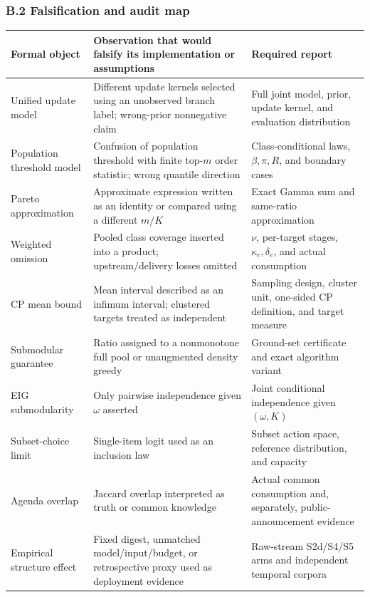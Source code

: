 \documentclass[
  11pt]{article}
\begin{document}
\subsubsection{B.2 Falsification and audit
map}\label{b.2-falsification-and-audit-map}

\begin{longtable}[]{@{}
  >{\raggedright\arraybackslash}p{}
  >{\raggedright\arraybackslash}p{}
  >{\raggedright\arraybackslash}p{}@{}}
\toprule\noalign{}
\begin{minipage}[b]{\linewidth}\raggedright
Formal object
\end{minipage} & \begin{minipage}[b]{\linewidth}\raggedright
Observation that would falsify its implementation or assumptions
\end{minipage} & \begin{minipage}[b]{\linewidth}\raggedright
Required report
\end{minipage} \\
\midrule\noalign{}
\endhead
\bottomrule\noalign{}
\endlastfoot
Unified update model & Different update kernels selected using an
unobserved branch label; wrong-prior nonnegative claim & Full joint
model, prior, update kernel, and evaluation distribution \\
Population threshold model & Confusion of population threshold with
finite top-\(m\) order statistic; wrong quantile direction &
Class-conditional laws, \(\beta,\pi,R\), and boundary cases \\
Pareto approximation & Approximate expression written as an identity or
compared using a different \(m/K\) & Exact Gamma sum and same-ratio
approximation \\
Weighted omission & Pooled class coverage inserted into a product;
upstream/delivery losses omitted & \(\nu\), per-target stages,
\(\kappa_e,\delta_e\), and actual consumption \\
CP mean bound & Mean interval described as an infimum interval;
clustered targets treated as independent & Sampling design, cluster
unit, one-sided CP definition, and target measure \\
Submodular guarantee & Ratio assigned to a nonmonotone full pool or
unaugmented density greedy & Ground-set certificate and exact algorithm
variant \\
EIG submodularity & Only pairwise independence given \(\omega\) asserted
& Joint conditional independence given \((\omega,K)\) \\
Subset-choice limit & Single-item logit used as an inclusion law &
Subset action space, reference distribution, and capacity \\
Agenda overlap & Jaccard overlap interpreted as truth or common
knowledge & Actual common consumption and, separately,
public-announcement evidence \\
Empirical structure effect & Fixed digest, unmatched model/input/budget,
or retrospective proxy used as deployment evidence & Raw-stream
S2d/S4/S5 arms and independent temporal corpora \\
\end{longtable}
\end{document}
